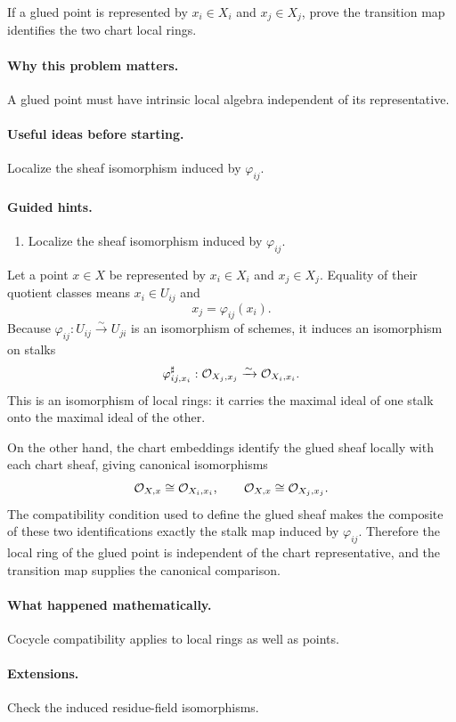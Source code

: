 \begin{problem}\label{prob:vi20-p13}
If a glued point is represented by $x_i\in X_i$ and $x_j\in X_j$, prove the transition map identifies the two chart local rings.
\end{problem}

\ifdefined\FullProblemDossiers
\paragraph{Why this problem matters.}
A glued point must have intrinsic local algebra independent of its representative.

\paragraph{Useful ideas before starting.}
Localize the sheaf isomorphism induced by $\varphi_{ij}$.

\paragraph{Guided hints.}
\begin{enumerate}
\item Localize the sheaf isomorphism induced by $\varphi_{ij}$.
\end{enumerate}

\begin{solution}
Let a point $x\in X$ be represented by $x_i\in X_i$ and $x_j\in X_j$.  Equality of their quotient classes means $x_i\in U_{ij}$ and
\[
x_j=\varphi_{ij}(x_i).
\]
Because $\varphi_{ij}:U_{ij}\xrightarrow{\sim}U_{ji}$ is an isomorphism of schemes, it induces an isomorphism on stalks
\[
\varphi_{ij,x_i}^{\sharp}:\mathcal O_{X_j,x_j}\xrightarrow{\sim}\mathcal O_{X_i,x_i}.
\]
This is an isomorphism of local rings: it carries the maximal ideal of one stalk onto the maximal ideal of the other.

On the other hand, the chart embeddings identify the glued sheaf locally with each chart sheaf, giving canonical isomorphisms
\[
\mathcal O_{X,x}\cong\mathcal O_{X_i,x_i},\qquad
\mathcal O_{X,x}\cong\mathcal O_{X_j,x_j}.
\]
The compatibility condition used to define the glued sheaf makes the composite of these two identifications exactly the stalk map induced by $\varphi_{ij}$.  Therefore the local ring of the glued point is independent of the chart representative, and the transition map supplies the canonical comparison.
\end{solution}


\paragraph{What happened mathematically.}
Cocycle compatibility applies to local rings as well as points.

\paragraph{Extensions.}
Check the induced residue-field isomorphisms.
\fi
